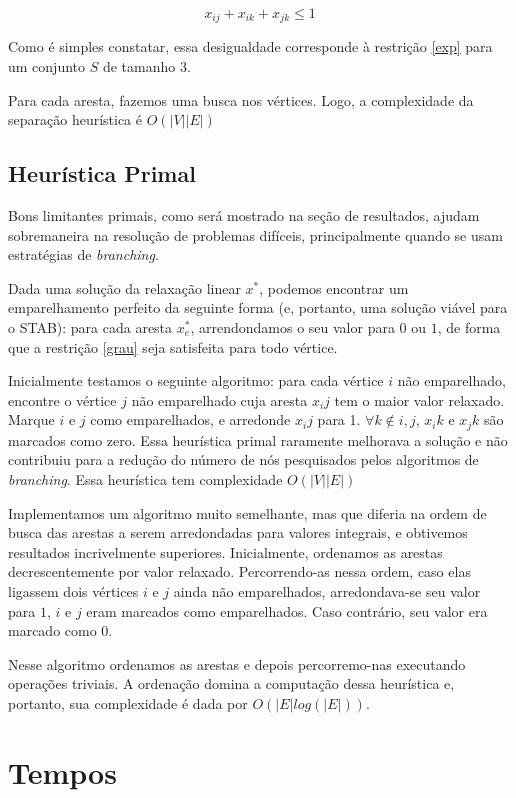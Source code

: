 \documentclass[11pt]{article}
\begin{document}
\begin{equation}
 x_{ij} + x_{ik} + x_{jk} \leq 1
\end{equation}

Como é simples constatar, essa desigualdade corresponde à restrição
\eqref{exp} para um conjunto $S$ de tamanho $3$. 

Para cada aresta, fazemos uma busca nos vértices. Logo, a complexidade
da separação heurística é $O(|V||E|)$

\subsection{Heurística Primal}

Bons limitantes primais, como será mostrado na seção de resultados,
ajudam sobremaneira na resolução de problemas difíceis, principalmente
quando se usam estratégias de \emph{branching}.

Dada uma solução da relaxação linear $x^*$, podemos encontrar um
emparelhamento perfeito da seguinte forma (e, portanto, uma solução
viável para o STAB): para cada aresta $x^*_e$, arrendondamos o seu valor
para $0$ ou $1$, de forma que a restrição \eqref{grau} seja satisfeita
para todo vértice. 

Inicialmente testamos o seguinte algoritmo: para cada vértice $i$ não
emparelhado, encontre o vértice $j$ não emparelhado cuja aresta $x_ij$
tem o maior valor relaxado. Marque $i$ e $j$ como emparelhados, e
arredonde $x_ij$ para 1. $\forall k \notin {i,j}$, $x_ik$ e $x_jk$ são
marcados como zero. Essa heurística primal raramente melhorava a
solução e não contribuiu para a redução do número de nós pesquisados
pelos algoritmos de \emph{branching}. Essa heurística tem complexidade
$O(|V||E|)$ 

Implementamos um algoritmo muito semelhante, mas que diferia na ordem de
busca das arestas a serem arredondadas para valores integrais, e
obtivemos resultados incrivelmente superiores. Inicialmente, ordenamos
as arestas decrescentemente por valor relaxado. Percorrendo-as nessa
ordem, caso elas ligassem dois vértices $i$ e $j$ ainda não emparelhados,
arredondava-se seu valor para $1$, $i$ e $j$ eram marcados como
emparelhados. Caso contrário, seu valor era marcado como $0$. 

Nesse algoritmo ordenamos as arestas e depois percorremo-nas executando
operações triviais. A ordenação domina a computação dessa heurística e,
portanto, sua complexidade é dada por $O(|E| log (|E|))$.


\section{Tempos}
\end{document}
